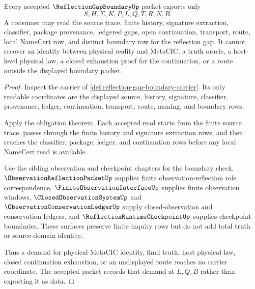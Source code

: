 \begin{theorem}
\label{thm:reflection-gap-boundary-nonescape}
Every accepted $\ReflectionGapBoundaryUp$ packet exports only
$$
S,H,\Sigma,K,P,L,Q,T,R,N,B.
$$
A consumer may read the source trace, finite history, signature extraction, classifier, package provenance, ledgered gaps, open continuation, transport, route, local NameCert row, and distinct boundary row for the reflection gap. It cannot recover an identity between physical reality and MetaCIC, a truth oracle, a host-level physical law, a closed exhaustion proof for the continuation, or a route outside the displayed boundary packet.
\end{theorem}
\begin{proof}
Inspect the carrier of \autoref{def:reflection-gap-boundary-carrier}. Its only readable coordinates are the displayed source, history, signature, classifier, provenance, ledger, continuation, transport, route, naming, and boundary rows.

Apply the obligation theorem. Each accepted read starts from the finite source trace, passes through the finite history and signature extraction rows, and then reaches the classifier, package, ledger, and continuation rows before any local NameCert read is available.

Use the sibling observation and checkpoint chapters for the boundary check. $\ObservationReflectionPacketUp$ supplies finite observation-reflection role correspondence, $\FiniteObservationInterfaceUp$ supplies finite observation windows, $\ClosedObservationSystemUp$ and $\ObservationConservationLedgerUp$ supply closed-observation and conservation ledgers, and $\ReflectionRuntimeCheckpointUp$ supplies checkpoint boundaries. These surfaces preserve finite inquiry rows but do not add total truth or source-domain identity.

Thus a demand for physical-MetaCIC identity, final truth, host physical law, closed continuation exhaustion, or an undisplayed route reaches no carrier coordinate. The accepted packet records that demand at $L,Q,B$ rather than exporting it as data.
\end{proof}

